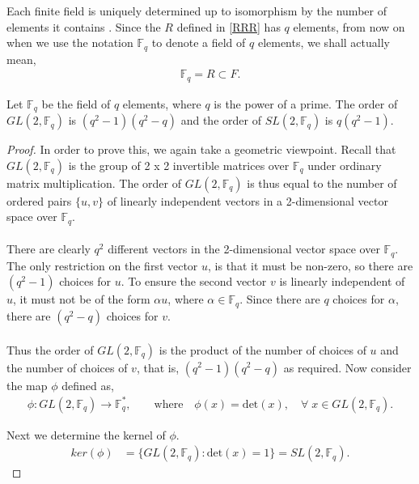 Each finite field is uniquely determined up to isomorphism by the number of elements it contains \cite[p.227]{stewart}. Since the $R$ defined in \eqref{RRR} has $q$ elements, from now on when we use the notation $\mathbb{F}_q$ to denote a field of $q$ elements, we shall actually mean,
\begin{align}\label{subfield} \mathbb{F}_q = R \subset F.
\end{align}

\begin{lemma}\label{ordersl2q} Let $\mathbb{F}_q$ be the field of $q$ elements, where $q$ is the power of a prime. The order of $GL(2,\mathbb{F}_q)$ is $(q^2-1)(q^2-q)$ and the order of $SL(2,\mathbb{F}_q)$ is $q(q^2-1)$.
\end{lemma}

\begin{proof} In order to prove this, we again take a geometric viewpoint. Recall that $GL(2,\mathbb{F}_q)$ is the group of 2 x 2 invertible matrices over $\mathbb{F}_q$ under ordinary matrix multiplication. The order of $GL(2,\mathbb{F}_q)$ is thus equal to the number of ordered pairs $\{u,v\}$ of linearly independent vectors in a 2-dimensional vector space over $\mathbb{F}_q$. \\
\\
There are clearly $q^2$ different vectors in the 2-dimensional vector space over $\mathbb{F}_q$. The only restriction on the first vector $u$, is that it must be non-zero, so there are $(q^2 - 1)$ choices for $u$. To ensure the second vector $v$ is linearly independent of $u$, it must not be of the form $\alpha u$, where $\alpha \in \mathbb{F}_q$. Since there are $q$ choices for $\alpha$, there are $(q^2-q)$ choices for $v$. \\
\\
Thus the order of $GL(2,\mathbb{F}_q)$ is the product of the number of choices of $u$ and the number of choices of $v$, that is, $(q^2-1)(q^2-q)$ as required. Now consider the map $\phi$ defined as,
\begin{align*} \phi : GL(2,\mathbb{F}_q) \longrightarrow \mathbb{F}^*_q, \qquad \text{where} \quad \! \! \phi(x) = \text{det}(x), \quad \forall \; x \in GL(2,\mathbb{F}_q).
\end{align*}

Next we determine the kernel of $\phi$.
\begin{align*} ker(\phi) &= \{  GL(2,\mathbb{F}_q) : \text{det}(x) = 1 \} = SL(2,\mathbb{F}_q).
\end{align*}


\end{proof}
